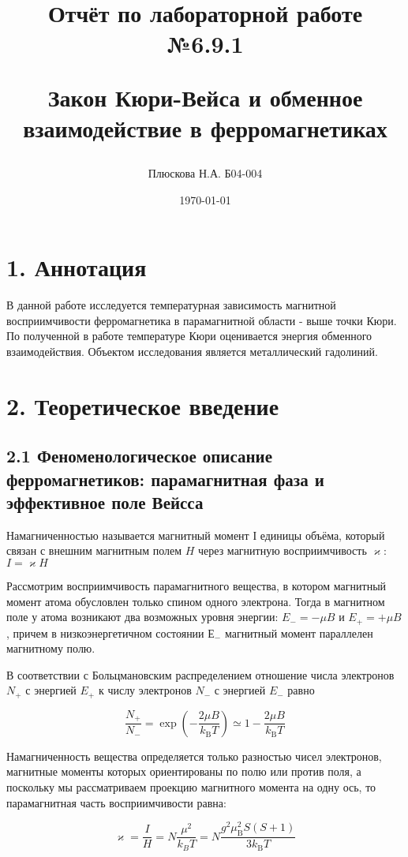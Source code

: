 \documentclass[a4paper,12pt]{report}
\title{Отчёт по лабораторной работе №6.9.1

Закон Кюри-Вейса и обменное взаимодействие в ферромагнетиках}
\author{Плюскова Н.А. Б04-004 }
\date{\today}
\begin{document}
\maketitle

\section*{1. Аннотация}
В данной работе исследуется температурная зависимость магнитной восприимчивости ферромагнетика в парамагнитной области - выше точки Кюри. По полученной в работе температуре Кюри оценивается энергия обменного взаимодействия. Объектом исследования является металлический гадолиний.


\section*{2. Теоретическое введение}
\subsection*{2.1 Феноменологическое описание ферромагнетиков: парамагнитная фаза и эффективное поле Вейсса}

Намагниченностью называется магнитный момент $І$ единицы объёма, который связан с внешним магнитным полем $H$ через магнитную восприимчивость $\varkappa$: $I = \varkappa H$

Рассмотрим восприимчивость парамагнитного вещества, в котором магнитный момент атома обусловлен только спином одного электрона. Тогда в магнитном поле у атома возникают два возможных уровня энергии: $E_{-}=-\mu B$ и $E_{+}=+\mu B$, причем в низкоэнергетичном состоянии $Е_-$ магнитный момент параллелен магнитному полю.

В соответствии с Больцмановским распределением отношение числа электронов $N_{+}$ с энергией $E_{+}$ к числу электронов $N_-$ с энергией $E_-$ равно

\begin{equation}\label{bolzman}
    \frac{N_{+}}{N_{-}}=\exp \left(-\frac{2 \mu B}{k_{\mathrm{B}} T}\right) \simeq 1-\frac{2 \mu B}{k_{\mathrm{B}} T}
\end{equation}

Намагниченность вещества определяется только разностью чисел электронов,
магнитные моменты которых ориентированы по полю или против поля, а поскольку мы рассматриваем проекцию магнитного момента на одну ось, то парамагнитная часть восприимчивости равна:

\begin{equation}\label{kappa-easy}
    \varkappa = \frac{I}{H} = N \frac{\mu^2}{k_B T} = N \frac{g^{2} \mu_{\mathrm{B}}^{2} S(S+1)}{3 k_{\mathrm{B}} T}
\end{equation}
\end{document}
